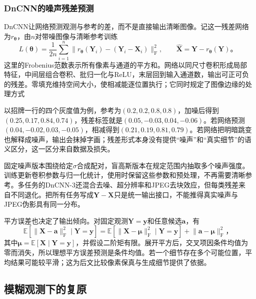\subsubsection{DnCNN的噪声残差预测}
\label{sec:vision-restoration-dncnn}

DnCNN让网络预测观测与参考的差，而不是直接输出清晰图像。记这一残差网络为$r_{\bm{\theta}}$，由$n$对带噪图像与清晰参考训练
\begin{equation}
 L(\bm{\theta})=\frac{1}{2n}\sum_{i=1}^{n}
 \bigl\lVert r_{\bm{\theta}}(\bm{Y}_i)
             -(\bm{Y}_i-\bm{X}_i)\bigr\rVert_{\mathrm{F}}^2,
 \qquad
 \widehat{\bm{X}}=\bm{Y}-r_{\bm{\theta}}(\bm{Y})\text{。}
 \label{eq:vision-dncnn}
\end{equation}
这里的Frobenius范数表示所有像素与通道的平方和。网络以同尺寸卷积形成局部特征，中间层组合卷积、批归一化与ReLU，末层回到输入通道数，输出可正可负的残差。零填充维持空间大小，使相减能逐位置执行；它同时规定了图像边缘的处理方式

以招牌一行的四个灰度值为例，参考为$(0.2,0.2,0.8,0.8)$，加噪后得到$(0.25,0.17,0.84,0.74)$，残差标签就是$(0.05,-0.03,0.04,-0.06)$。若网络预测$(0.04,-0.02,0.03,-0.05)$，相减得到$(0.21,0.19,0.81,0.79)$。若网络把明暗跳变也解释成噪声，输出会抹掉字画；残差形式本身没有提供“噪声”和“真实细节”的语义区分，这一区分来自数据及损失。

固定噪声版本围绕给定$\sigma$合成配对，盲高斯版本在规定范围内抽取多个噪声强度。训练更新卷积参数与归一化统计，使用时保留这些参数和预处理，不再需要清晰参考。多任务的DnCNN-3还混合去噪、超分辨率和JPEG去块效应，但每类残差来自不同退化。把所有任务写成$\bm{Y}-\bm{X}$只是统一输出接口，不能推得真实噪声与JPEG伪影具有同一分布。

平方误差也决定了输出倾向。对固定观测$\bm{Y}=\bm{y}$和任意候选$\bm{a}$，有
\begin{equation}
 \mathbb{E}\!\left[\lVert\bm{X}-\bm{a}\rVert_{\mathrm{F}}^2
                  \mid\bm{Y}=\bm{y}\right]
 =
 \mathbb{E}\!\left[\lVert\bm{X}-\bm{\mu}\rVert_{\mathrm{F}}^2
                  \mid\bm{Y}=\bm{y}\right]
 +\lVert\bm{a}-\bm{\mu}\rVert_{\mathrm{F}}^2\text{，}
 \label{eq:vision-conditional-mean}
\end{equation}
其中$\bm{\mu}=\mathbb{E}[\bm{X}\mid\bm{Y}=\bm{y}]$，并假设二阶矩有限。展开平方后，交叉项因条件均值为零而消失，所以理想平方误差预测是条件均值。若一个细节存在多个可能位置，平均结果可能较平滑；这为后文比较像素保真与生成细节提供了依据。

\subsection{模糊观测下的复原}
\label{sec:vision-restoration-deblurring}


